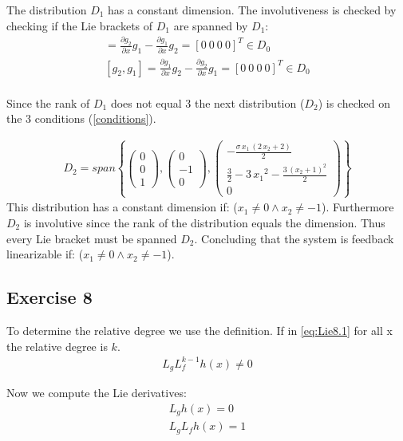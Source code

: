 \documentclass[a4paper,12pt]{article}
\begin{document}
The distribution $D_1$ has a constant dimension. The involutiveness is checked by checking if the Lie brackets of $D_1$ are spanned by $D_1$:
\begin{align}
[g_1,g_2] = \frac{\partial{g_2}}{\partial{x}}g_1-\frac{\partial{g_1}}{\partial{x}}g_2= [0\ 0\ 0\ 0]^T\in D_0\\ \nonumber
[g_2,g_1] = \frac{\partial{g_1}}{\partial{x}}g_2-\frac{\partial{g_2}}{\partial{x}}g_1
 = [0\ 0\ 0\ 0]^T\in D_0\\ \nonumber
\end{align}

Since the rank of $D_1$ does not equal 3  the next distribution ($D_2$) is checked on the 3 conditions (\ref{conditions}). 

\begin{align}\label{D2}
D_2=span\left\{
\begin{pmatrix} 0 \\ 0 \\ 1 \end{pmatrix} 
, \begin{pmatrix} 0 \\ -1 \\ 0\end{pmatrix}
, \begin{pmatrix} -\frac{\sigma \,x_{1}\,\left(2\,x_{2}+2\right)}{2} \\ \frac{3}{2}-3\,{x_{1}}^2-\frac{3\,{\left(x_{2}+1\right)}^2}{2} \\ 0 \end{pmatrix} 
\right\}
\end{align}
This distribution has a constant dimension if: ($x_1 \neq 0 \wedge x_2\neq-1$). Furthermore $D_2$ is involutive since the rank of the distribution equals the dimension. Thus every Lie bracket must be spanned $D_2$.  Concluding that the system is feedback linearizable if: ($x_1 \neq 0 \wedge x_2\neq-1$).

\subsection{Exercise 8}
To determine the relative degree we use the definition. If in \ref{eq:Lie8.1} for all x the relative degree is $k$. 
\begin{align}
L_gL_f^{k-1}h(x)\neq 0
\label{eq:Lie8.1}
\end{align}

Now we compute the Lie derivatives:  
\begin{align}
L_gh(x)=0 \\
L_gL_fh(x)=1
\label{eq:Lie8}
\end{align}
\end{document}
